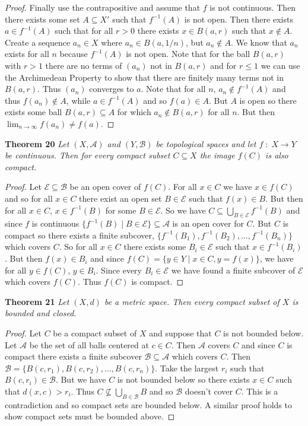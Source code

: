 \documentclass{article}
\begin{document}
\begin{flushleft}
\begin{proof}
Finally use the contrapositive and assume that $f$ is not continuous. Then there exists some set $A \subseteq X'$ such that $f^{-1}(A)$ is not open. Then there exists $a \in f^{-1}(A)$ such that for all $r>0$ there exists $x \in B(a,r)$ such that $x \notin A$. Create a sequence $a_n \in X$ where $a_n \in B(a, 1/n)$, but $a_n \notin A$. We know that $a_n$ exists for all $n$ because $f^{-1}(A)$ is not open. Note that for the ball $B(a,r)$ with $r>1$ there are no terms of $(a_n)$ not in $B(a,r)$ and for $r \leq 1$ we can use the Archimedean Property to show that there are finitely many terms not in $B(a,r)$. Thus $(a_n)$ converges to $a$. Note that for all $n$, $a_n \notin f^{-1}(A)$ and thus $f(a_n) \notin A$, while $a \in f^{-1}(A)$ and so $f(a) \in A$. But $A$ is open so there exists some ball $B(a,r) \subseteq A$ for which $a_n \notin B(a,r)$ for all $n$. But then $\lim_{n \rightarrow \infty} f(a_n) \neq f(a)$.
\end{proof}

\textbf{Theorem 20}
\textsl{Let $(X, \mathcal{A})$ and $(Y, \mathcal{B})$ be topological spaces and let $f \; : \; X \rightarrow Y$ be continuous. Then for every compact subset $C \subseteq X$ the image $f(C)$ is also compact.}
\begin{proof}
Let $\mathcal{E} \subseteq \mathcal{B}$ be an open cover of $f(C)$. For all $x \in C$ we have $x \in f(C)$ and so for all $x \in C$ there exist an open set $B \in \mathcal{E}$ such that $f(x) \in B$. But then for all $x \in C$, $x \in f^{-1}(B)$ for some $B \in \mathcal{E}$. So we have $C \subseteq \bigcup_{B \in \mathcal{E}} f^{-1}(B)$ and since $f$ is continuous $\{f^{-1}(B) \mid B \in \mathcal{E}\} \subseteq \mathcal{A}$ is an open cover for $C$. But $C$ is compact so there exists a finite subcover, $\{f^{-1}(B_1), f^{-1}(B_2), \dots , f^{-1}(B_n)\}$ which covers $C$. So for all $x \in C$ there exists some $B_i \in \mathcal{E}$ such that $x \in f^{-1}(B_i)$. But then $f(x) \in B_i$ and since $f(C) = \{ y \in Y \mid x \in C, y=f(x) \}$, we have for all $y \in f(C)$, $y \in B_i$. Since every $B_i \in \mathcal{E}$ we have found a finite subcover of $\mathcal{E}$ which covers $f(C)$. Thus $f(C)$ is compact.
\end{proof}

\textbf{Theorem 21}
\textsl{Let $(X, d)$ be a metric space. Then every compact subset of $X$ is bounded and closed.}
\begin{proof}
Let $C$ be a compact subset of $X$ and suppose that $C$ is not bounded below. Let $\mathcal{A}$ be the set of all balls centered at $c \in C$. Then $\mathcal{A}$ covers $C$ and since $C$ is compact there exists a finite subcover $\mathcal{B} \subseteq \mathcal{A}$ which covers $C$. Then $\mathcal{B} = \{B(c,r_1), B(c,r_2), \dots , B(c,r_n)\}$. Take the largest $r_i$ such that $B(c,r_i) \in \mathcal{B}$. But we have $C$ is not bounded below so there exists $x \in C$ such that $d(x,c) > r_i$. Thus $C \nsubseteq \bigcup_{B \in \mathcal{B}} B$ and so $\mathcal{B}$ doesn't cover $C$. This is a contradiction and so compact sets are bounded below. A similar proof holds to show compact sets must be bounded above.\newline


\end{proof}
\end{flushleft}
\end{document}
